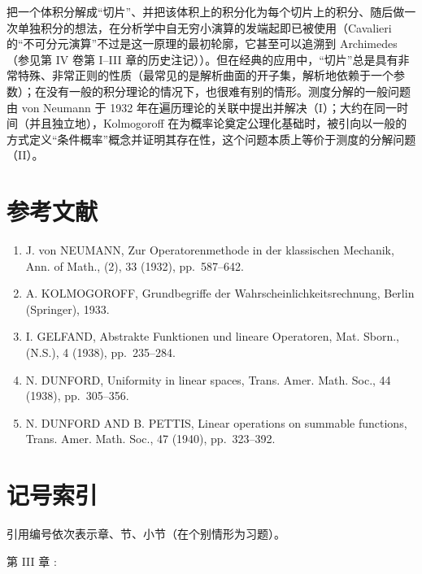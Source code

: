 把一个体积分解成“切片”、并把该体积上的积分化为每个切片上的积分、随后做一次单独积分的想法，在分析学中自无穷小演算的发端起即已被使用（Cavalieri 的“不可分元演算”不过是这一原理的最初轮廓，它甚至可以追溯到 Archimedes（参见第 IV 卷第 I--III 章的历史注记））。但在经典的应用中，“切片”总是具有非常特殊、非常正则的性质（最常见的是解析曲面的开子集，解析地依赖于一个参数）；在没有一般的积分理论的情况下，也很难有别的情形。测度分解的一般问题由 von Neumann 于 1932 年在遍历理论的关联中提出并解决（I）；大约在同一时间（并且独立地），Kolmogoroff 在为概率论奠定公理化基础时，被引向以一般的方式定义“条件概率”概念并证明其存在性，这个问题本质上等价于测度的分解问题（II）。

\chapter*{参考文献}
{}

\begin{enumerate}
\def\labelenumi{(\Roman{enumi})}
\item
  J. von NEUMANN, Zur Operatorenmethode in der klassischen Mechanik, Ann. of Math., (2), 33 (1932), pp.~587--642.
\item
  A. KOLMOGOROFF, Grundbegriffe der Wahrscheinlichkeitsrechnung, Berlin (Springer), 1933.
\item
  I. GELFAND, Abstrakte Funktionen und lineare Operatoren, Mat. Sborn., (N.S.), 4 (1938), pp.~235--284.
\item
  N. DUNFORD, Uniformity in linear spaces, Trans. Amer. Math. Soc., 44 (1938), pp.~305--356.
\item
  N. DUNFORD AND B. PETTIS, Linear operations on summable functions, Trans. Amer. Math. Soc., 47 (1940), pp.~323--392.
\end{enumerate}

\chapter*{记号索引}
{}

引用编号依次表示章、节、小节（在个别情形为习题）。

第 III 章 :

